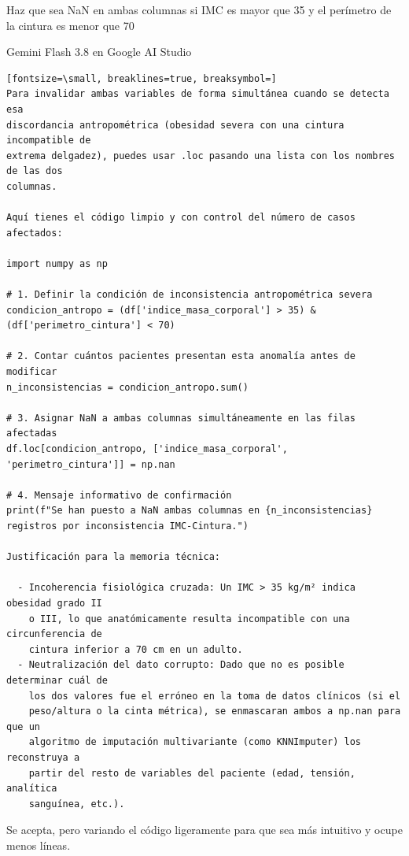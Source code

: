 \documentclass[12pt,a4paper,oneside]{book}
\begin{document}
\begin{iaprompt}
Haz que sea NaN en ambas columnas si IMC es mayor que 35 y el perímetro de la
cintura es menor que 70
\end{iaprompt}
\begin{iaresp}{Gemini Flash 3.8 en Google AI Studio}
\begin{Verbatim}[fontsize=\small, breaklines=true, breaksymbol=]
Para invalidar ambas variables de forma simultánea cuando se detecta esa
discordancia antropométrica (obesidad severa con una cintura incompatible de
extrema delgadez), puedes usar .loc pasando una lista con los nombres de las dos
columnas.

Aquí tienes el código limpio y con control del número de casos afectados:

import numpy as np

# 1. Definir la condición de inconsistencia antropométrica severa
condicion_antropo = (df['indice_masa_corporal'] > 35) & (df['perimetro_cintura'] < 70)

# 2. Contar cuántos pacientes presentan esta anomalía antes de modificar
n_inconsistencias = condicion_antropo.sum()

# 3. Asignar NaN a ambas columnas simultáneamente en las filas afectadas
df.loc[condicion_antropo, ['indice_masa_corporal', 'perimetro_cintura']] = np.nan

# 4. Mensaje informativo de confirmación
print(f"Se han puesto a NaN ambas columnas en {n_inconsistencias} registros por inconsistencia IMC-Cintura.")

Justificación para la memoria técnica:

  - Incoherencia fisiológica cruzada: Un IMC > 35 kg/m² indica obesidad grado II
    o III, lo que anatómicamente resulta incompatible con una circunferencia de
    cintura inferior a 70 cm en un adulto.
  - Neutralización del dato corrupto: Dado que no es posible determinar cuál de
    los dos valores fue el erróneo en la toma de datos clínicos (si el
    peso/altura o la cinta métrica), se enmascaran ambos a np.nan para que un
    algoritmo de imputación multivariante (como KNNImputer) los reconstruya a
    partir del resto de variables del paciente (edad, tensión, analítica
    sanguínea, etc.).

\end{Verbatim}
\end{iaresp}
\begin{iaanalisis}
Se acepta, pero variando el código ligeramente para que sea más intuitivo y ocupe menos líneas.
\end{iaanalisis}
\end{document}
